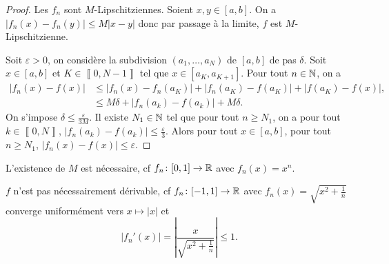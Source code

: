 \documentclass[12pt]{article}
\begin{document}
\begin{proof}
    Les $f_{n}$ sont $M$-Lipschitziennes. Soient $x,y\in[a,b]$. On a $\left\lvert f_{n}(x)-f_{n}(y)\right\rvert\leqslant M\left\lvert x-y\right\rvert$ donc par passage à la limite, $f$ est $M$-Lipschitzienne. 
    
    Soit $\varepsilon>0$, on considère la subdivision $(a_{1},\dots,a_{N})$ de $[a,b]$ de pas $\delta$. Soit $x\in[a,b]$ et $K\in\left\llbracket0,N-1\right\rrbracket$ tel que $x\in[a_{K},a_{K+1}]$. Pour tout $n\in\mathbb{N}$, on a 
    \begin{align*}
        \left\lvert f_{n}(x)-f(x)\right\rvert
        &\leqslant\left\lvert f_{n}(x)-f_{n}(a_{K})\right\rvert+\left\lvert f_{n}(a_{K})-f(a_{K})\right\rvert+\left\lvert f(a_{K})-f(x)\right\rvert,\\
        &\leqslant M\delta+\left\lvert f_{n}(a_{k})-f(a_{k})\right\rvert+M\delta.
    \end{align*}
    On s'impose $\delta\leqslant\frac{\varepsilon}{3M}$. Il existe $N_{1}\in\mathbb{N}$ tel que pour tout $n\geqslant N_{1}$, on a pour tout $k\in\left\llbracket0,N\right\rrbracket$, $\left\lvert f_{n}(a_{k})-f(a_{k})\right\rvert\leqslant\frac{\varepsilon}{3}$. Alors pour tout $x\in[a,b]$, pour tout $n\geqslant N_{1}$, $\left\lvert f_{n}(x)-f(x)\right\rvert\leqslant\varepsilon$.
\end{proof}

\begin{remark}
    L'existence de $M$ est nécessaire, cf $f_{n}\colon[0,1]\to\mathbb{R}$ avec $f_n(x)=x^{n}$.
\end{remark}

\begin{remark}
    $f$ n'est pas nécessairement dérivable, cf $f_{n}\colon[-1,1]\to\mathbb{R}$ avec $f_n(x)=\sqrt{x^{2}+\frac{1}{n}}$ converge uniformément vers $x\mapsto\left\lvert x\right\rvert$ et 
    \begin{equation*}
        \left\lvert f_n'(x)\right\rvert=\left\lvert\frac{x}{\sqrt{x^{2}+\frac{1}{n}}}\right\rvert\leqslant1.
    \end{equation*}
\end{remark}
\end{document}

